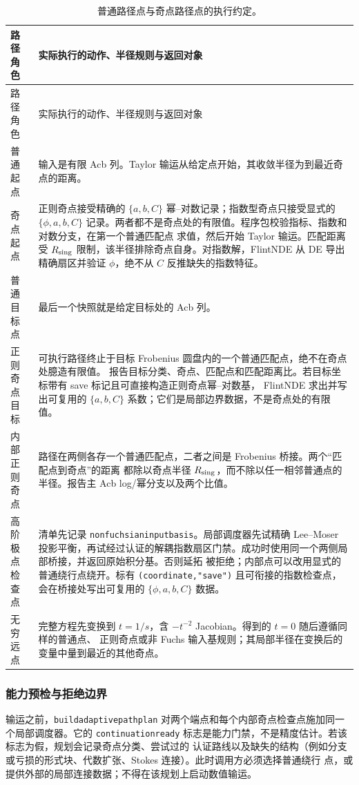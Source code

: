 \documentclass[11pt,a4paper]{ctexart}
\renewcommand{\_}{\origunderscore\allowbreak}
\begin{document}
\small
\begin{longtable}{L{0.22\textwidth}L{0.72\textwidth}}
\caption{普通路径点与奇点路径点的执行约定。}
\label{tab:path-location-contract}\\
\toprule
路径角色 & 实际执行的动作、半径规则与返回对象 \\
\midrule
\endfirsthead
\toprule
路径角色 & 实际执行的动作、半径规则与返回对象 \\
\midrule
\endhead
普通起点 & 输入是有限 Acb 列。Taylor 输运从给定点开始，其收敛半径为到最近奇点的距离。 \\
奇点起点 & 正则奇点接受精确的 $\{a,b,C\}$ 幂--对数记录；指数型奇点只接受显式的
$\{\phi,a,b,C\}$ 记录。两者都不是奇点处的有限值。程序包校验指标、指数和对数分支，在第一个普通匹配点
求值，然后开始 Taylor 输运。匹配距离受 $R_{\rm sing}$ 限制，该半径排除奇点自身。对指数解，FlintNDE
从 DE 导出精确扇区并验证 $\phi$，绝不从 $C$ 反推缺失的指数特征。 \\
普通目标点 & 最后一个快照就是给定目标处的 Acb 列。 \\
正则奇点目标 & 可执行路径终止于目标 Frobenius 圆盘内的一个普通匹配点，绝不在奇点处臆造有限值。
报告目标分类、奇点、匹配点和匹配距离比。若目标坐标带有 save 标记且可直接构造正则奇点幂--对数基，
FlintNDE 求出并写出可复用的 $\{a,b,C\}$ 系数；它们是局部边界数据，不是奇点处的有限值。 \\
内部正则奇点 & 路径在两侧各存一个普通匹配点，二者之间是 Frobenius 桥接。两个“匹配点到奇点”的距离
都除以奇点半径 $R_{\rm sing}$，而不除以任一相邻普通点的半径。报告主 Acb log/幂分支以及两个比值。 \\
高阶极点检查点 & 清单先记录 \texttt{non\_fuchsian\_input\_basis}。局部调度器先试精确 Lee--Moser
投影平衡，再试经过认证的解耦指数扇区门禁。成功时使用同一个两侧局部桥接，并返回原始积分基。否则延拓
被拒绝；内部点可以改用显式的普通绕行点绕开。标有 \texttt{(coordinate,"save")} 且可衔接的指数检查点，
会在桥接处写出可复用的 $\{\phi,a,b,C\}$ 数据。 \\
无穷远点 & 完整方程先变换到 $t=1/s$，含 $-t^{-2}$ Jacobian。得到的 $t=0$ 随后遵循同样的普通点、
正则奇点或非 Fuchs 输入基规则；其局部半径在变换后的变量中量到最近的其他奇点。 \\
\bottomrule
\end{longtable}
\normalsize

\subsubsection{能力预检与拒绝边界}

输运之前，\texttt{build\_adaptive\_path\_plan} 对两个端点和每个内部奇点检查点施加同一个局部调度器。它的
\texttt{continuation\_ready} 标志是能力门禁，不是精度估计。若该标志为假，规划会记录奇点分类、尝试过的
认证路线以及缺失的结构（例如分支或亏损的形式块、代数扩张、Stokes 连接）。此时调用方必须选择普通绕行
点，或提供外部的局部连接数据；不得在该规划上启动数值输运。
\end{document}
